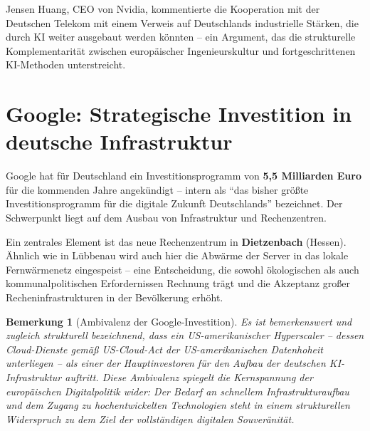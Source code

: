 ﻿\documentclass[12pt, a4paper, openany]{report}
\newtheorem{remark}[theorem]{Bemerkung}
\begin{document}
Jensen Huang, CEO von Nvidia, kommentierte die Kooperation mit der
Deutschen Telekom mit einem Verweis auf Deutschlands industrielle Stärken,
die durch KI weiter ausgebaut werden könnten -- ein Argument, das die
strukturelle Komplementarität zwischen europäischer Ingenieurskultur und
fortgeschrittenen KI-Methoden unterstreicht.

\section{Google: Strategische Investition in deutsche Infrastruktur}
\label{sec:google_deutschland}

Google hat für Deutschland ein Investitionsprogramm von \textbf{5,5 Milliarden
	Euro} für die kommenden Jahre angekündigt -- intern als ``das bisher größte
Investitionsprogramm für die digitale Zukunft Deutschlands'' bezeichnet. Der
Schwerpunkt liegt auf dem Ausbau von Infrastruktur und Rechenzentren.

Ein zentrales Element ist das neue Rechenzentrum in \textbf{Dietzenbach}
(Hessen). Ähnlich wie in Lübbenau wird auch hier die Abwärme der Server in
das lokale Fernwärmenetz eingespeist -- eine Entscheidung, die sowohl
ökologischen als auch kommunalpolitischen Erfordernissen Rechnung trägt und
die Akzeptanz großer Recheninfrastrukturen in der Bevölkerung erhöht.

\begin{remark}[Ambivalenz der Google-Investition]
	\label{rem:google_ambivalenz}
	Es ist bemerkenswert und zugleich strukturell bezeichnend, dass ein
	US-amerikanischer Hyperscaler -- dessen Cloud-Dienste gemäß US-Cloud-Act
	der US-amerikanischen Datenhoheit unterliegen -- als einer der
	Hauptinvestoren für den Aufbau der deutschen KI-Infrastruktur auftritt.
	Diese Ambivalenz spiegelt die Kernspannung der europäischen Digitalpolitik
	wider: Der Bedarf an schnellem Infrastrukturaufbau und dem Zugang zu
	hochentwickelten Technologien steht in einem strukturellen Widerspruch
	zu dem Ziel der vollständigen digitalen Souveränität.
\end{remark}
\end{document}
